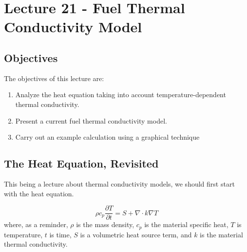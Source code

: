 \chapter{Lecture 21 - Fuel Thermal Conductivity Model}
\label{ch:ch21}
\section{Objectives}
The objectives of this lecture are:
\begin{enumerate}
\item Analyze the heat equation taking into account temperature-dependent thermal conductivity.
\item Present a current fuel thermal conductivity model.
\item Carry out an example calculation using a graphical technique
\end{enumerate}

\section{The Heat Equation, Revisited}

This being a lecture about thermal conductivity models, we should first start with the heat equation.

\begin{equation}
\rho c_p \frac{\partial T}{\partial t} = S + \nabla \cdot k \nabla T
\label{eq:heat_eq}
\end{equation}
where, as a reminder, $\rho$ is the mass density, $c_p$ is the material specific heat, $T$ is temperature, $t$ is time, $S$ is a volumetric heat source term, and $k$ is the material thermal conductivity.

